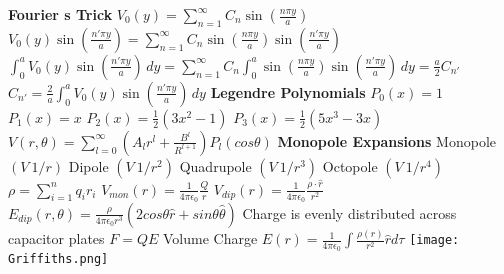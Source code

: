 \documentclass[1pt]{report}
\begin{document}
\begin{multicols}{3}
\begin{flushleft}
\textbf{Fourier s Trick}
$V_0(y) = \sum_{n=1}^{\infty} C_n \sin \left(\frac{n \pi y}{a} \right)$
\linebreak
$V_0(y) \sin \left(\frac{n' \pi y}{a} \right) =\sum_{n=1}^{\infty} C_n \sin \left(\frac{n \pi y}{a} \right)\sin \left(\frac{n' \pi y}{a} \right)$
\linebreak
$ \int_0^a V_0(y) \sin \left(\frac{n' \pi y}{a} \right) \, dy = \sum_{n=1}^{\infty} C_n \int_0^a  \sin \left(\frac{n \pi y}{a} \right)\sin \left(\frac{n' \pi y}{a} \right) \, dy = \frac{a}{2} C_{n'}$
\linebreak
$C_{n'} = \frac{2}{a} \int_0^a V_0(y) \sin \left(\frac{n' \pi y}{a} \right) \, dy$
\linebreak
\textbf{Legendre Polynomials}
\linebreak
$P_0(x) = 1$
\linebreak
$P_1(x) = x$
\linebreak
$P_2(x) = \frac{1}{2}(3x^2 - 1)$
\linebreak
$P_3(x) = \frac{1}{2}(5x^3-3x)$
\linebreak
$V(r,\theta)=\sum_{l=0}^{\infty}(A_lr^l+\frac{B^l}{R^{l+1}})P_l(cos\theta)$
\textbf{Monopole Expansions}
\linebreak
Monopole $(V~1/r)$
\linebreak
Dipole $(V~1/r^2)$
\linebreak
Quadrupole $(V~1/r^3)$
\linebreak
Octopole $(V~1/r^4)$
\linebreak
$\rho=\sum_{i=1}^{n}q_ir_i$
\linebreak
$V_{mon}(r)=\frac{1}{4\pi\epsilon_0}\frac{Q}{r}$
\linebreak
$V_{dip}(r)=\frac{1}{4\pi\epsilon_0}\frac{\rho\cdot\hat{r}}{r^2}$
\linebreak
$E_{dip}(r,\theta)=\frac{\rho}{4\pi\epsilon_0r^3}(2cos\theta\hat{r}+sin\theta\hat{\theta})$
\linebreak
Charge is evenly distributed across capacitor plates
\linebreak
$F=QE$
\linebreak
Volume Charge
$E(r)=\frac{1}{4\pi\epsilon_0}\int\frac{\rho(r)}{r^2}\hat{r}d\tau$
\texttt{[image: Griffiths.png]}
\end{flushleft}
\end{multicols}
\end{document}
